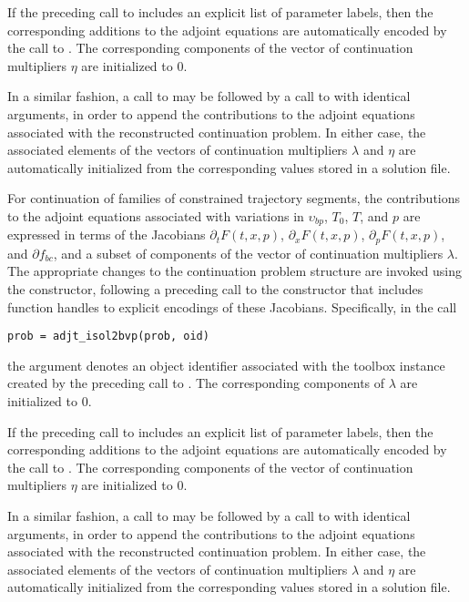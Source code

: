 If the preceding call to  includes an explicit list of parameter labels, then the corresponding additions to the adjoint equations are automatically encoded by the call to . The corresponding components of the vector of continuation multipliers $\eta$ are initialized to $0$.

In a similar fashion, a call to  may be followed by a call to  with identical arguments, in order to append the contributions to the adjoint equations associated with the reconstructed continuation problem. In either case, the associated elements of the vectors of continuation multipliers $\lambda$ and $\eta$ are automatically initialized from the corresponding values stored in a solution file.

For continuation of families of constrained trajectory segments, the contributions to the adjoint equations associated with variations in $\upsilon_{bp}$, $T_0$, $T$, and $p$ are expressed in terms of the Jacobians $\partial_t F(t,x,p)$, $\partial_x F(t,x,p)$, $\partial_p F(t,x,p)$, and $\partial f_{bc}$, and a subset of components of the vector of continuation multipliers $\lambda$. The appropriate changes to the continuation problem structure are invoked using the  constructor, following a preceding call to the  constructor that includes function handles to explicit encodings of these Jacobians.  Specifically, in the call
\begin{lstlisting}[language=coco-highlight]
prob = adjt_isol2bvp(prob, oid)
\end{lstlisting}
the  argument denotes an object identifier associated with the toolbox instance created by the preceding call to . The corresponding components of $\lambda$ are initialized to $0$.

If the preceding call to  includes an explicit list of parameter labels, then the corresponding additions to the adjoint equations are automatically encoded by the call to . The corresponding components of the vector of continuation multipliers $\eta$ are initialized to $0$.

In a similar fashion, a call to  may be followed by a call to  with identical arguments, in order to append the contributions to the adjoint equations associated with the reconstructed continuation problem. In either case, the associated elements of the vectors of continuation multipliers $\lambda$ and $\eta$ are automatically initialized from the corresponding values stored in a solution file.

